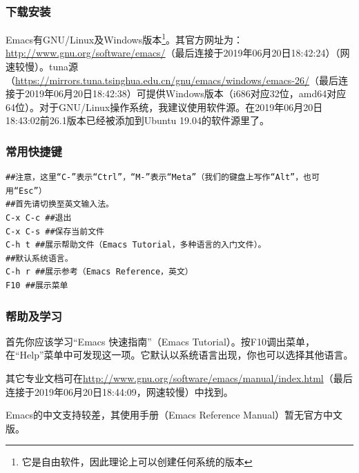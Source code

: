 \subsubsection{下载安装}
Emacs有GNU/Linux及Windows版本\footnote{它是自由软件，因此理论上可以创建任何系统的版本}。其官方网址为：\url{http://www.gnu.org/software/emacs/}（最后连接于2019年06月20日18:42:24）（网速较慢）。tuna源（\url{https://mirrors.tuna.tsinghua.edu.cn/gnu/emacs/windows/emacs-26/}（最后连接于2019年06月20日18:42:38）可提供Windows版本（i686对应32位，amd64对应64位）。对于GNU/Linux操作系统，我建议使用软件源。在2019年06月20日18:43:02前26.1版本已经被添加到Ubuntu 19.04的软件源里了。
\subsubsection{常用快捷键}
\begin{verbatim}
##注意，这里“C-”表示“Ctrl”，“M-”表示“Meta”（我们的键盘上写作“Alt”，也可用“Esc”）
##首先请切换至英文输入法。
C-x C-c ##退出
C-x C-s ##保存当前文件
C-h t ##展示帮助文件（Emacs Tutorial，多种语言的入门文件）。
##默认系统语言。
C-h r ##展示参考（Emacs Reference，英文）
F10 ##展示菜单
\end{verbatim}
\subsubsection{帮助及学习}
首先你应该学习“Emacs 快速指南”（Emacs Tutorial）。按F10调出菜单，在“Help”菜单中可发现这一项。它默认以系统语言出现，你也可以选择其他语言。\par
其它专业文档可在\url{http://www.gnu.org/software/emacs/manual/index.html}（最后连接于2019年06月20日18:44:09，网速较慢）中找到。\par
Emacs的中文支持较差，其使用手册（Emacs Reference Manual）暂无官方中文版。
